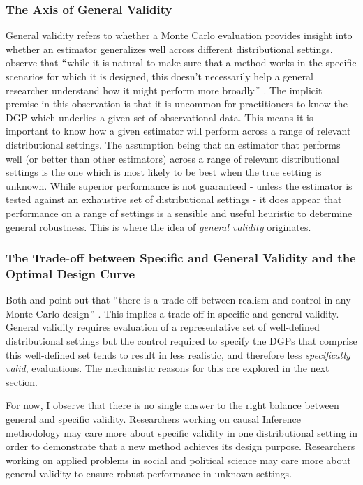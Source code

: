 \documentclass[../main.tex]{subfiles}
\begin{document}
\subsubsection{The Axis of General Validity}

General validity refers to whether a Monte Carlo evaluation provides insight into whether an estimator generalizes well across different distributional settings. \textcite{Dorie2019Automated1} observe that $``$while it is natural to make sure that a method works in the specific scenarios for which it is designed, this doesn’t necessarily help a general researcher understand how it might perform more broadly$"$ . The implicit premise in this observation is that it is uncommon for practitioners to know the DGP which underlies a given set of observational data. This means it is important to know how a given estimator will perform across a range of relevant distributional settings. The assumption being that an estimator that performs well (or better than other estimators) across a range of relevant distributional settings is the one which is most likely to be best when the true setting is unknown. While superior performance is not guaranteed - unless the estimator is tested against an exhaustive set of distributional settings - it does appear that performance on a range of settings is a sensible and useful heuristic to determine general robustness. This is where the idea of \textit{general validity }originates.\par

\subsubsection{The Trade-off between Specific and General Validity and the Optimal Design Curve}

Both \textcite{Paxton2001MonteImplementation} and \textcite{Wendling2018ComparingDatabases} point out that $``$there is a trade-off between realism and control in any Monte Carlo design$"$ \parencite{Paxton2001MonteImplementation}. This implies a trade-off in specific and general validity. General validity requires evaluation of a representative set of well-defined distributional settings but the control required to specify the DGPs that comprise this well-defined set tends to result in less realistic, and therefore less \textit{specifically valid}, evaluations. The mechanistic reasons for this are explored in the next section.\par


\vspace{\baselineskip}
For now, I observe that there is no single answer to the right balance between general and specific validity. Researchers working on causal Inference methodology may care more about specific validity in one distributional setting in order to demonstrate that a new method achieves its design purpose. Researchers working on applied problems in social and political science may care more about general validity to ensure robust performance in unknown settings.\par
\end{document}
